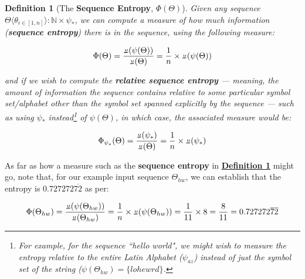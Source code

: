 \documentclass[a4paper, 18pt]{book} %
\newtheorem{defn}{Definition}
\newcommand{\invpi}{\rotatebox[origin=c]{180}{$\pi$}}
\begin{document}
\vspace{1em}
\begin{defn}[The \textbf{Sequence Entropy}, $\Phi(\Theta)$]
\label{DEFENTROPYb}
Given any sequence $\Theta \langle \theta_{i \in [1,n]} \rangle : \mathbb{N} \times \psi_*$, we can compute a measure of how much information (\textbf{sequence entropy}) there is in the sequence, using the following measure:

\vspace{1em}
\begin{equation}
\label{EQSEQENTROPY}
\Phi(\Theta) = \frac{\invpi(\psi(\Theta))}{\invpi(\Theta)} = \frac{1}{n} \times \invpi(\psi(\Theta))
\end{equation}
\vspace{1em}

and if we wish to compute the \textbf{relative sequence entropy} --- meaning, the amount of information the sequence contains relative to some particular symbol set/alphabet other than the symbol set spanned explicitly by the sequence --- such as using $\psi_*$ instead\footnote{For example, for the sequence ``hello world", we might wish to measure the entropy relative to the entire Latin Alphabet ($\psi_{az}$) instead of just the symbol set of the string ($\psi(\Theta_{hw}) = \{lohe wrd\}$.} of $\psi(\Theta)$, in which case, the associated measure would be: 

\vspace{1em}
\begin{equation}
\Phi_{\psi_*}(\Theta) = \frac{\invpi(\psi_*)}{\invpi(\Theta)} = \frac{1}{n} \times \invpi(\psi_*)
\end{equation}
\end{defn}
\vspace{1em}

As far as how a measure such as the \textbf{sequence entropy} in  \textbf{\hyperref[DEFENTROPYb]{Definition \ref{DEFENTROPYb}}} might go, note that, for our example input sequence $\Theta_{hw}$, we can establish that the entropy is $0.727272\overline{72}$ as per:

\vspace{1em}
\begin{equation}
\Phi(\Theta_{hw}) = \frac{\invpi(\psi(\Theta_{hw}))}{\invpi(\Theta_{hw})} = \frac{1}{n} \times \invpi(\psi(\Theta_{hw})) = \frac{1}{11} \times 8 = \frac{8}{11} = 0.727272\overline{72}
\end{equation}
\vspace{1em}
\end{document}
